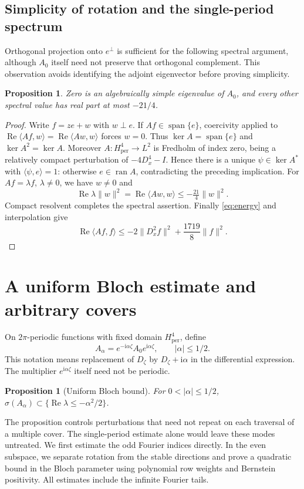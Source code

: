 \documentclass[a4paper,11pt]{article}
\numberwithin{equation}{section}
\newtheorem{proposition}[theorem]{Proposition}
\theoremstyle{definition}
\theoremstyle{remark}
\newcommand{\ii}{\mathrm i}
\newcommand{\per}{\mathrm{per}}
\newcommand{\norm}[1]{\lVert#1\rVert}
\newcommand{\ip}[2]{\langle#1,#2\rangle}
\renewcommand{\Re}{\operatorname{Re}}
\begin{document}
\subsection{Simplicity of rotation and the single-period spectrum}
Orthogonal projection onto $e^\perp$ is sufficient for the following spectral argument, although $A_0$ itself need not preserve that orthogonal complement. This observation avoids identifying the adjoint eigenvector before proving simplicity.
\begin{proposition}\label{prop:single-spectrum}
Zero is an algebraically simple eigenvalue of $A_0$, and every other spectral value has real part at most $-21/4$.
\end{proposition}
\begin{proof}
Write $f=ze+w$ with $w\perp e$. If $Af\in\operatorname{span}\{e\}$, coercivity applied to $\Re\ip{Af}w=\Re\ip{Aw}w$ forces $w=0$. Thus $\ker A=\operatorname{span}\{e\}$ and $\ker A^2=\ker A$. Moreover $A:H^4_\per\to L^2$ is Fredholm of index zero, being a relatively compact perturbation of $-4D_x^4-I$. Hence there is a unique $\psi\in\ker A^*$ with $\ip\psi e=1$: otherwise $e\in\operatorname{ran}A$, contradicting the preceding implication. For $Af=\lambda f$, $\lambda\ne0$, we have $w\ne0$ and
\[
 \Re\lambda\norm w^2=\Re\ip{Aw}w\le-\tfrac{21}{4}\norm w^2.
\]
Compact resolvent completes the spectral assertion. Finally \eqref{eq:energy} and interpolation give
\begin{equation}\label{eq:interpolation}
 \Re\ip{Af}f\le-2\norm{D_x^2f}^2+\frac{1719}{8}\norm f^2.
\end{equation}
\end{proof}


\section{A uniform Bloch estimate and arbitrary covers}\label{app:bloch}
On $2\pi$-periodic functions with fixed domain $H^4_\per$, define
\begin{equation}\label{eq:bloch-definition}
 A_\alpha=e^{-\ii\alpha\zeta}A_0e^{\ii\alpha\zeta},\qquad |\alpha|\le1/2.
\end{equation}
This notation means replacement of $D_\zeta$ by $D_\zeta+\ii\alpha$ in the differential expression. The multiplier $e^{\ii\alpha\zeta}$ itself need not be periodic.
\begin{proposition}[Uniform Bloch bound]\label{prop:bloch}
For $0<|\alpha|\le1/2$, $\sigma(A_\alpha)\subset\{\Re\lambda\le-\alpha^2/2\}$.
\end{proposition}
The proposition controls perturbations that need not repeat on each traversal of a multiple cover. The single-period estimate alone would leave these modes untreated. We first estimate the odd Fourier indices directly. In the even subspace, we separate rotation from the stable directions and prove a quadratic bound in the Bloch parameter using polynomial row weights and Bernstein positivity. All estimates include the infinite Fourier tails.
\end{document}
